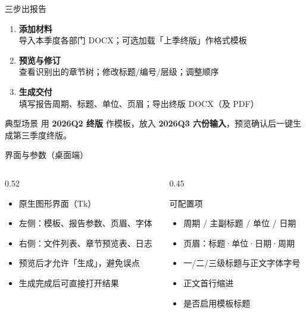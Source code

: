 \documentclass[aspectratio=169,10pt,UTF8]{ctexbeamer}
\begin{document}
\begin{frame}{三步出报告}
  \begin{enumerate}
    \item[\textcolor{BrandBlue}{\textbf{1}}]
      \textbf{添加材料}\\[0.2em]
      {\small 导入本季度各部门 DOCX；可选加载「上季终版」作格式模板}
      \vspace{0.55em}
    \item[\textcolor{BrandBlue}{\textbf{2}}]
      \textbf{预览与修订}\\[0.2em]
      {\small 查看识别出的章节树；修改标题/编号/层级；调整顺序}
      \vspace{0.55em}
    \item[\textcolor{BrandBlue}{\textbf{3}}]
      \textbf{生成交付}\\[0.2em]
      {\small 填写报告周期、标题、单位、页眉；导出终版 DOCX（及 PDF）}
  \end{enumerate}
  \vspace{0.8em}
  \begin{block}{典型场景}
    用 \textbf{2026Q2 终版} 作模板，放入 \textbf{2026Q3 六份输入}，预览确认后一键生成第三季度终版。
  \end{block}
\end{frame}

\begin{frame}{界面与参数（桌面端）}
  \begin{columns}[T]
    \begin{column}{0.52\textwidth}
      \begin{itemize}
        \item 原生图形界面（Tk）
        \item 左侧：模板、报告参数、页眉、字体
        \item 右侧：文件列表、章节预览表、日志
        \item 预览后才允许「生成」，避免误点
        \item 生成完成后可直接打开结果
      \end{itemize}
    \end{column}
    \begin{column}{0.45\textwidth}
      \begin{exampleblock}{可配置项}
        \small
        \begin{itemize}
          \item 周期 / 主副标题 / 单位 / 日期
          \item 页眉：标题·单位·日期·周期
          \item 一/二/三级标题与正文字体字号
          \item 正文首行缩进
          \item 是否启用模板标题
        \end{itemize}
      \end{exampleblock}
    \end{column}
  \end{columns}
\end{frame}
\end{document}
